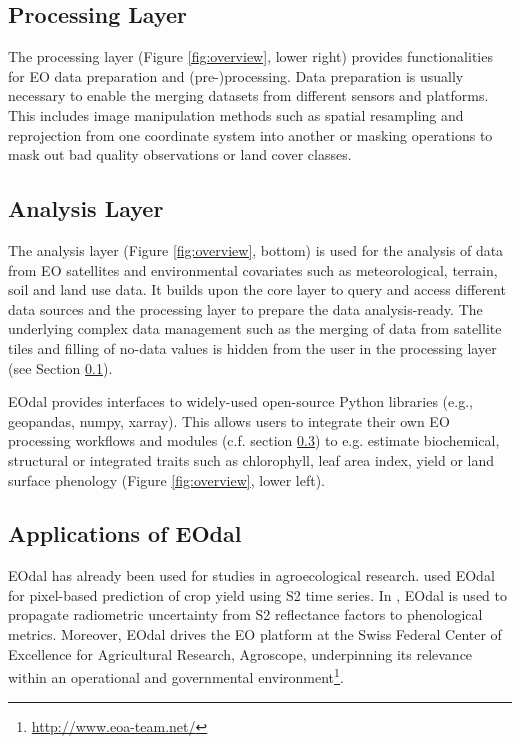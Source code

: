 \subsection{Processing Layer}
\label{subsec:processing-layer}
The processing layer (Figure \ref{fig:overview}, lower right) provides functionalities for EO data preparation and (pre-)processing. Data preparation is usually necessary to enable the merging datasets from different sensors and platforms. This includes image manipulation methods such as spatial resampling and reprojection from one coordinate system into another or masking operations to mask out bad quality observations or land cover classes.

\subsection{Analysis Layer}
The analysis layer (Figure \ref{fig:overview}, bottom) is used for the analysis of data from EO satellites and environmental covariates such as meteorological, terrain, soil and land use data. It builds upon the core layer to query and access different data sources and the processing layer to prepare the data analysis-ready. The underlying complex data management such as the merging of data from satellite tiles and filling of no-data values is hidden from the user in the processing layer (see Section \ref{subsec:processing-layer}).

EOdal provides interfaces to widely-used open-source Python libraries (e.g., geopandas, numpy, xarray). This allows users to integrate their own EO processing workflows and modules (c.f. section \ref{subsec:supplementary-modules}) to e.g. estimate biochemical, structural or integrated traits such as chlorophyll, leaf area index, yield or land surface phenology (Figure \ref{fig:overview}, lower left). 

\subsection{Applications of EOdal}
\label{subsec:supplementary-modules}
EOdal has already been used for studies in agroecological research. \citet{perich_pixel-based_2022} used EOdal for pixel-based prediction of crop yield using S2 time series.  In \citet{graf_propagating_2022}, EOdal is used to propagate radiometric uncertainty from S2 reflectance factors to phenological metrics. Moreover, EOdal drives the EO platform at the Swiss Federal Center of Excellence for Agricultural Research, Agroscope, underpinning its relevance within an operational and governmental environment\footnote{\url{http://www.eoa-team.net/}}.

